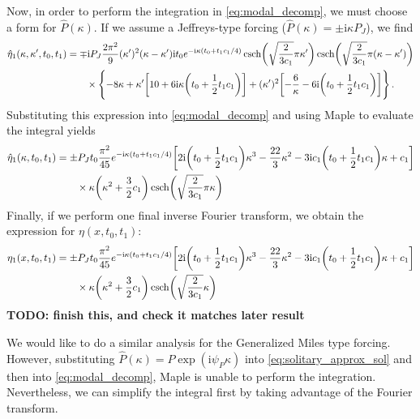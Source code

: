 \documentclass{jfm}
\newcommand{\GenPk}{\hat{P}(\kappa)}
\newcommand{\im}{\mathrm{i}}
\begin{document}
Now, in order to perform the integration in \cref{eq:modal_decomp}, we
must choose a form for $\GenPk$.
If we assume a Jeffreys-type forcing ($\GenPk = \pm \im \kappa P_J$), we
find
\begin{equation}
  \begin{split}
  \hat{\eta}_1(\kappa,\kappa',t_0,t_1) &=
    \mp \im P_J \frac{2 \pi^2}{9} (\kappa')^2 (\kappa-\kappa') \im t_0
    e^{-\im \kappa ( t_0 + t_1 c_1/4)}
    \csch( \sqrt{\frac{2}{3 c_1}} \pi \kappa')
    \csch( \sqrt{\frac{2}{3 c_1}} \pi (\kappa-\kappa')) \\
    &\qquad \times \Biggl\{
    -8 \kappa
    + \kappa' \bqty{10 + 6 \im \kappa \pqty{t_0 + \frac{1}{2} t_1 c_1}}
    + (\kappa')^2 \bqty{-\frac{6}{\kappa} - 6 \im \pqty{t_0 +
      \frac{1}{2} t_1 c_1}}
  \Biggr\}
  \,.
  \end{split}
\end{equation}
Substituting this expression into \cref{eq:modal_decomp} and using Maple
to evaluate the integral yields
\begin{equation}
  \begin{split}
  \hat{\eta}_1(\kappa,t_0,t_1) &=
    \pm P_J t_0 \frac{\pi^2}{45} e^{-\im \kappa (t_0 + t_1 c_1/4)}
    \bqty{2 \im \pqty{t_0 + \frac{1}{2} t_1 c_1} \kappa^3
    -\frac{22}{3} \kappa^2
    -3 \im c_1 \pqty{t_0 + \frac{1}{2} t_1 c_1} \kappa + c_1} \\
  &\qquad \times
    \kappa \pqty{\kappa^2+\frac{3}{2} c_1}
    \csch(\sqrt{\frac{2}{3 c_1}} \pi \kappa)
  \end{split}
  \label{eq:jeffreys_sol1}
\end{equation}
Finally, if we perform one final inverse Fourier transform, we obtain
the expression for $\eta(x,t_0,t_1)$:
\begin{equation}
  \begin{split}
  \eta_1(x,t_0,t_1) &=
    \pm P_J t_0 \frac{\pi^2}{45} e^{-\im \kappa (t_0 + t_1 c_1/4)}
    \bqty{2 \im \pqty{t_0 + \frac{1}{2} t_1 c_1} \kappa^3
    -\frac{22}{3} \kappa^2
    -3 \im c_1 \pqty{t_0 + \frac{1}{2} t_1 c_1} \kappa + c_1} \\
  &\qquad \times
    \kappa \pqty{\kappa^2+\frac{3}{2} c_1}
    \csch(\sqrt{\frac{2}{3 c_1}} \kappa)
  \end{split}
  \label{eq:jeffreys_sol1_real}
\end{equation}
\textbf{TODO: finish this, and check it matches later result}

We would like to do a similar analysis for the Generalized Miles type
forcing.
However, substituting $\GenPk = P \exp(\im \psi_P \kappa)$ into
\cref{eq:solitary_approx_sol} and then into \cref{eq:modal_decomp},
Maple is unable to perform the integration.
Nevertheless, we can simplify the integral first by taking advantage of
the Fourier transform.
\end{document}
